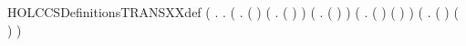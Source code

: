 \begin{SaveVerbatim}{HOLCCSDefinitionsTRANSXXdef}
\HOLTokenTurnstile{}  \HOLSymConst{=}
   (\HOLTokenLambda{}  .
        \HOLSymConst{\HOLTokenForall{}}.
            (\HOLSymConst{\HOLTokenForall{}}  .
                 ( \HOLSymConst{=} ) \HOLSymConst{\HOLTokenDisj{}}
                 (\HOLSymConst{\HOLTokenExists{}} . ( \HOLSymConst{=}  \HOLSymConst{\ensuremath{+}} ) \HOLSymConst{\HOLTokenConj{}}    ) \HOLSymConst{\HOLTokenDisj{}}
                 (\HOLSymConst{\HOLTokenExists{}} . ( \HOLSymConst{=}  \HOLSymConst{\ensuremath{+}} ) \HOLSymConst{\HOLTokenConj{}}    ) \HOLSymConst{\HOLTokenDisj{}}
                 (\HOLSymConst{\HOLTokenExists{}}  .
                      ( \HOLSymConst{=}  \HOLSymConst{\ensuremath{\parallel}} ) \HOLSymConst{\HOLTokenConj{}} ( \HOLSymConst{=}  \HOLSymConst{\ensuremath{\parallel}} ) \HOLSymConst{\HOLTokenConj{}}
                         ) \HOLSymConst{\HOLTokenDisj{}}
                 (\HOLSymConst{\HOLTokenExists{}}  .
                      ( \HOLSymConst{=}  \HOLSymConst{\ensuremath{\parallel}} ) \HOLSymConst{\HOLTokenConj{}} ( \HOLSymConst{=}  \HOLSymConst{\ensuremath{\parallel}} ) \HOLSymConst{\HOLTokenConj{}}
                         ) \HOLSymConst{\HOLTokenDisj{}}

\end{SaveVerbatim}
